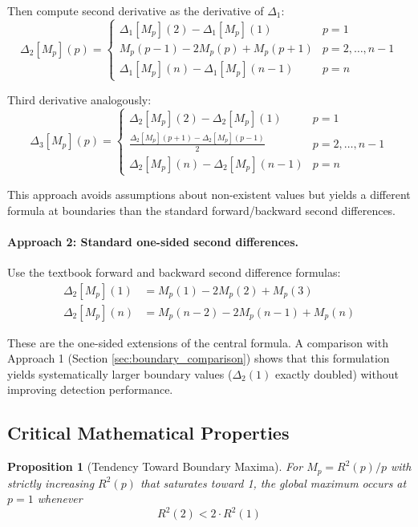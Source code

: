 \documentclass[11pt,a4paper]{article}
\newtheorem{proposition}{Proposition}
\begin{document}
Then compute second derivative as the derivative of $\Delta_1$:
\begin{equation}
\Delta_2[M_p](p) = \begin{cases}
\Delta_1[M_p](2) - \Delta_1[M_p](1) & p = 1 \\
M_p(p-1) - 2M_p(p) + M_p(p+1) & p = 2,\ldots,n-1 \\
\Delta_1[M_p](n) - \Delta_1[M_p](n-1) & p = n
\end{cases}
\label{eq:delta2}
\end{equation}

Third derivative analogously:
\begin{equation}
\Delta_3[M_p](p) = \begin{cases}
\Delta_2[M_p](2) - \Delta_2[M_p](1) & p = 1 \\
\frac{\Delta_2[M_p](p+1) - \Delta_2[M_p](p-1)}{2} & p = 2,\ldots,n-1 \\
\Delta_2[M_p](n) - \Delta_2[M_p](n-1) & p = n
\end{cases}
\label{eq:delta3}
\end{equation}

This approach avoids assumptions about non-existent values but yields a different formula at boundaries than the standard forward/backward second differences.

\paragraph{Approach 2: Standard one-sided second differences.}
Use the textbook forward and backward second difference formulas:
\begin{align}
\Delta_2[M_p](1) &= M_p(1) - 2M_p(2) + M_p(3) \label{eq:forward_delta2} \\
\Delta_2[M_p](n) &= M_p(n-2) - 2M_p(n-1) + M_p(n) \label{eq:backward_delta2}
\end{align}

These are the one-sided extensions of the central formula. A comparison with Approach 1 (Section \ref{sec:boundary_comparison}) shows that this formulation yields systematically larger boundary values ($\Delta_2(1)$ exactly doubled) without improving detection performance.

\subsection{Critical Mathematical Properties}

\begin{proposition}[Tendency Toward Boundary Maxima]
\label{prop:boundary_max}
For $M_p = R^2(p)/p$ with strictly increasing $R^2(p)$ that saturates toward 1, the global maximum occurs at $p=1$ whenever
\begin{equation}
R^2(2) < 2 \cdot R^2(1)
\end{equation}
\end{proposition}
\end{document}
